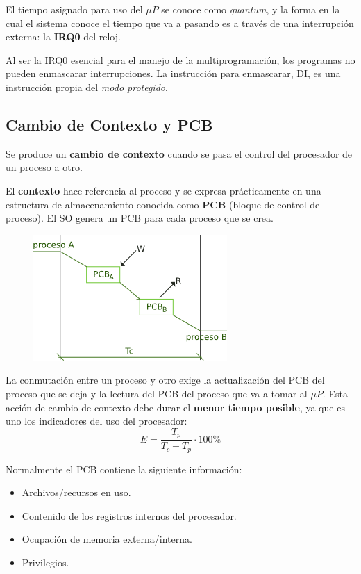 \documentclass[10pt,a4paper]{article}
\begin{document}
El tiempo asignado para uso del $\mu P$ se conoce como \textit{quantum}, y la forma en la cual el sistema conoce el tiempo que va a pasando es a través de una interrupción externa: la \textbf{IRQ0} del reloj.

Al ser la IRQ0 esencial para el manejo de la multiprogramación, los programas no pueden enmascarar interrupciones. La instrucción para enmascarar, DI, es una instrucción propia del \textit{modo protegido}.

\subsection{Cambio de Contexto y PCB}
Se produce un \textbf{cambio de contexto} cuando se pasa el control del procesador de un proceso a otro.

El \textbf{contexto} hace referencia al proceso y se expresa prácticamente en una estructura de almacenamiento conocida como \textbf{PCB} (bloque de control de proceso). El SO genera un PCB para cada proceso que se crea.

\begin{figure}
  \label{fig1}
  \centering
  \hbox{\includegraphics[width=0.6\textwidth-\fboxrule-\fboxrule]{fig1.png}}  
\end{figure}

La conmutación entre un proceso y otro exige la actualización del PCB del proceso que se deja y la lectura del PCB del proceso que va a tomar al $\mu P$. Esta acción de cambio de contexto debe durar el \textbf{menor tiempo posible}, ya que es uno los indicadores del uso del procesador:
\[E= \frac{T_p}{T_c+T_p} \cdot 100 \% \]

Normalmente el PCB contiene la siguiente información:
\begin{itemize}
\item Archivos/recursos en uso.
\item Contenido de los registros internos del procesador.
\item Ocupación de memoria externa/interna.
\item Privilegios.
\end{itemize}
\end{document}
